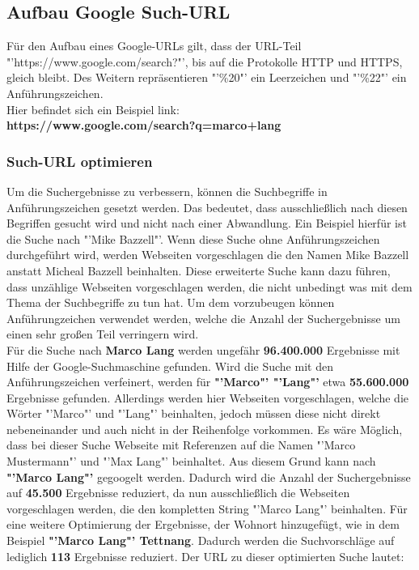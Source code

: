 		\subsection{Aufbau Google Such-URL}
		\label{subsec:AufbauGoogleURL}
		Für den Aufbau eines Google-URLs gilt, dass der URL-Teil "'https://www.google.com/search?"', bis auf die Protokolle HTTP und HTTPS, gleich bleibt. Des Weitern repräsentieren "'\%20"' ein Leerzeichen und "'\%22"' ein Anführungszeichen. \\
		Hier befindet sich ein Beispiel link:\\
		\textbf{https://www.google.com/search?q=marco+lang}
		
			\subsubsection{Such-URL optimieren}
			Um die Suchergebnisse zu verbessern, können die Suchbegriffe in Anführungszeichen gesetzt werden. Das bedeutet, dass ausschließlich nach diesen Begriffen gesucht wird und nicht nach einer Abwandlung. Ein Beispiel hierfür ist die Suche nach "'Mike Bazzell"'. Wenn diese Suche ohne Anführungszeichen durchgeführt wird, werden Webseiten vorgeschlagen die den Namen Mike Bazzell anstatt Micheal Bazzell beinhalten. Diese erweiterte Suche kann dazu führen, dass unzählige Webseiten vorgeschlagen werden, die nicht unbedingt was mit dem Thema der Suchbegriffe zu tun hat. Um dem vorzubeugen können Anführungzeichen verwendet werden, welche die Anzahl der Suchergebnisse um einen sehr großen Teil verringern wird. \cite{Bazzell}\\
			Für die Suche nach \textbf{Marco Lang} werden ungefähr \textbf{96.400.000} Ergebnisse mit Hilfe der Google-Suchmaschine gefunden. Wird die Suche mit den Anführungszeichen verfeinert, werden für \textbf{"'Marco"' "'Lang"'} etwa \textbf{55.600.000} Ergebnisse gefunden. Allerdings werden hier Webseiten vorgeschlagen, welche die Wörter "'Marco"' und "'Lang"' beinhalten, jedoch müssen diese nicht direkt nebeneinander und auch nicht in der Reihenfolge vorkommen. Es wäre Möglich, dass bei dieser Suche Webseite mit Referenzen auf die Namen "'Marco Mustermann"' und "'Max Lang"' beinhaltet. Aus diesem Grund kann nach \textbf{"'Marco Lang"'} gegoogelt werden. Dadurch wird die Anzahl der Suchergebnisse auf \textbf{45.500} Ergebnisse reduziert, da nun ausschließlich die Webseiten vorgeschlagen werden, die den kompletten String "'Marco Lang"' beinhalten. Für eine weitere Optimierung der Ergebnisse, der Wohnort hinzugefügt, wie in dem Beispiel \textbf{"'Marco Lang"' Tettnang}. Dadurch werden die Suchvorschläge auf lediglich \textbf{113} Ergebnisse reduziert. Der URL zu dieser optimierten Suche lautet: 
			
